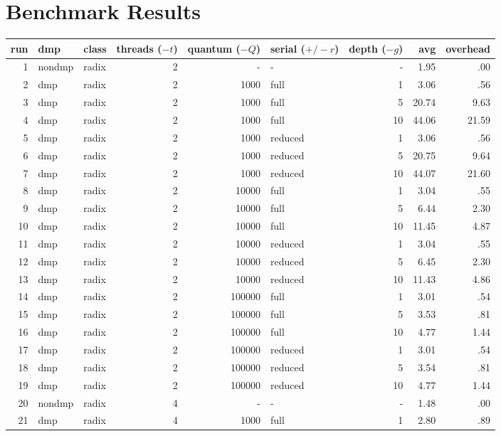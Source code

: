 \appendix

\chapter{Benchmark Results}

\begin{center}
\begin{small}
\begin{longtable}{rllrrlrrr}
\hline
run & dmp & class & threads ($-t$) & quantum ($-Q$) & serial ($+/-r$) & depth ($-g$) & avg & overhead\\
\hline
 1 & nondmp & radix & 2 & - & - & - & 1.95 & .00\\
 2 & dmp & radix & 2 & 1000 & full & 1 & 3.06 & .56\\
 3 & dmp & radix & 2 & 1000 & full & 5 & 20.74 & 9.63\\
 4 & dmp & radix & 2 & 1000 & full & 10 & 44.06 & 21.59\\
 5 & dmp & radix & 2 & 1000 & reduced & 1 & 3.06 & .56\\
 6 & dmp & radix & 2 & 1000 & reduced & 5 & 20.75 & 9.64\\
 7 & dmp & radix & 2 & 1000 & reduced & 10 & 44.07 & 21.60\\
 8 & dmp & radix & 2 & 10000 & full & 1 & 3.04 & .55\\
 9 & dmp & radix & 2 & 10000 & full & 5 & 6.44 & 2.30\\
10 & dmp & radix & 2 & 10000 & full & 10 & 11.45 & 4.87\\
11 & dmp & radix & 2 & 10000 & reduced & 1 & 3.04 & .55\\
12 & dmp & radix & 2 & 10000 & reduced & 5 & 6.45 & 2.30\\
13 & dmp & radix & 2 & 10000 & reduced & 10 & 11.43 & 4.86\\
14 & dmp & radix & 2 & 100000 & full & 1 & 3.01 & .54\\
15 & dmp & radix & 2 & 100000 & full & 5 & 3.53 & .81\\
16 & dmp & radix & 2 & 100000 & full & 10 & 4.77 & 1.44\\
17 & dmp & radix & 2 & 100000 & reduced & 1 & 3.01 & .54\\
18 & dmp & radix & 2 & 100000 & reduced & 5 & 3.54 & .81\\
19 & dmp & radix & 2 & 100000 & reduced & 10 & 4.77 & 1.44\\
\hline
20 & nondmp & radix & 4 & - & - & - & 1.48 & .00\\
21 & dmp & radix & 4 & 1000 & full & 1 & 2.80 & .89\\

\end{longtable}
\end{small}
\end{center}
